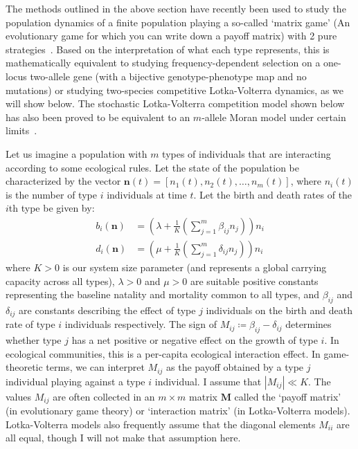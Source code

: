 The methods outlined in the above section have recently been used to study the population dynamics of a finite population playing a so-called `matrix game' (An evolutionary game for which you can write down a payoff matrix) with 2 pure strategies~\citep{tao_stochastic_2007}. Based on the interpretation of what each type represents, this is mathematically equivalent to studying frequency-dependent selection on a one-locus two-allele gene (with a bijective genotype-phenotype map and no mutations) or studying two-species competitive Lotka-Volterra dynamics, as we will show below. The stochastic Lotka-Volterra competition model shown below has also been proved to be equivalent to an $m$-allele Moran model under certain limits~\citep{constable_mapping_2017}.

Let us imagine a population with $m$ types of individuals that are interacting according to some ecological rules. Let the state of the population be characterized by the vector $\mathbf{n}(t) = [n_1(t),n_2(t),\ldots,n_m(t)]$, where $n_i(t)$ is the number of type $i$ individuals at time $t$. Let the birth and death rates of the $i$th type be given by:
\begin{equation}
\label{nD_example_numbers_b_d_rates}
\begin{aligned}
b_i(\mathbf{n}) &= \left(\lambda + \frac{1}{K}\left(\sum\limits_{j=1}^{m}\beta_{ij}n_j\right)\right)n_i\\
d_i(\mathbf{n}) &= \left(\mu + \frac{1}{K}\left(\sum\limits_{j=1}^{m}\delta_{ij}n_j\right)\right)n_i
\end{aligned}
\end{equation}
where $K > 0$ is our system size parameter (and represents a global carrying capacity across all types), $\lambda > 0$ and $\mu > 0$ are suitable positive constants representing the baseline natality and mortality common to all types, and $\beta_{ij}$ and $\delta_{ij}$ are constants describing the effect of type $j$ individuals on the birth and death rate of type $i$ individuals respectively. The sign of $M_{ij} \coloneqq \beta_{ij} - \delta_{ij}$ determines whether type $j$ has a net positive or negative effect on the growth of type $i$. In ecological communities, this is a per-capita ecological interaction effect. In game-theoretic terms, we can interpret $M_{ij}$ as the payoff obtained by a type $j$ individual playing against a type $i$ individual. I assume that $| M_{ij} | \ll K$. The values $M_{ij}$ are often collected in an $m \times m$ matrix $\mathbf{M}$ called the `payoff matrix' (in evolutionary game theory) or `interaction matrix' (in Lotka-Volterra models). Lotka-Volterra models also frequently assume that the diagonal elements $M_{ii}$ are all equal, though I will not make that assumption here.

